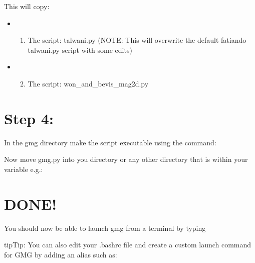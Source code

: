 \documentclass[a4paper,12pt,english]{sphinxmanual}
\begin{document}
This will copy:
\begin{itemize}
\item {} \begin{enumerate}
\item {} 
The script: talwani.py (NOTE: This will overwrite the default fatiando talwani.py script with some edits)

\end{enumerate}

\item {} \begin{enumerate}
\setcounter{enumi}{1}
\item {} 
The script: won\_and\_bevis\_mag2d.py

\end{enumerate}

\end{itemize}


\chapter{Step 4:}
\label{\detokenize{installation:step-4}}
In the gmg directory make the  script executable using the command:

\begin{sphinxVerbatim}[commandchars=\\\{\}]
  
\end{sphinxVerbatim}

Now move gmg.py into you  directory or any other directory that is within your  variable e.g.:

\begin{sphinxVerbatim}[commandchars=\\\{\}]
   
\end{sphinxVerbatim}


\chapter{DONE!}
\label{\detokenize{installation:done}}
You should now be able to launch gmg from a terminal by typing 

\begin{sphinxadmonition}{tip}{Tip:}
You can also edit your .bashrc file and create a custom launch command for GMG by adding an alias such as:

\begin{sphinxVerbatim}[commandchars=\\\{\}]
 
\end{sphinxVerbatim}
\end{sphinxadmonition}
\end{document}
